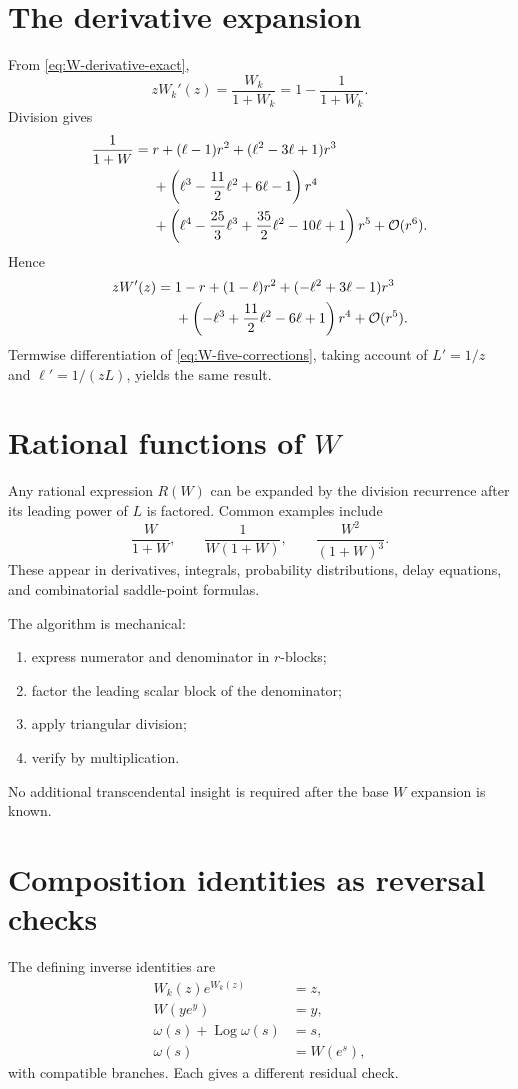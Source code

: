 \documentclass[11pt,openany]{book}
\theoremstyle{definition}
\theoremstyle{plain}
\theoremstyle{remark}
\newcommand{\bigO}{\mathcal{O}}
\DeclareMathOperator{\Log}{Log}
\begin{document}
\section{The derivative expansion}
From \cref{eq:W-derivative-exact},
\begin{equation}\label{eq:zWprime}
 zW_k'(z)=\frac{W_k}{1+W_k}=1-\frac1{1+W_k}.
\end{equation}
Division gives
\begin{align}
 \frac1{1+W}={}&r+(\ell-1)r^2+(\ell^2-3\ell+1)r^3\notag\\
 &+\left(\ell^3-\frac{11}{2}\ell^2+6\ell-1\right)r^4\notag\\
 &+\left(\ell^4-\frac{25}{3}\ell^3+\frac{35}{2}\ell^2-10\ell+1\right)r^5
 +\bigO(r^6).
\label{eq:one-over-oneplusW}
\end{align}
Hence
\begin{align}
 zW'(z)={}&1-r+(1-\ell)r^2
 +(-\ell^2+3\ell-1)r^3\notag\\
 &+\left(-\ell^3+\frac{11}{2}\ell^2-6\ell+1\right)r^4
 +\bigO(r^5).
\label{eq:Wprime-series}
\end{align}
Termwise differentiation of \cref{eq:W-five-corrections}, taking account of \(L'=1/z\) and \(\ell'=1/(zL)\), yields the same result.

\section{Rational functions of \texorpdfstring{\(W\)}{W}}
Any rational expression \(R(W)\) can be expanded by the division recurrence after its leading power of \(L\) is factored. Common examples include
\[
 \frac{W}{1+W},
 \qquad
 \frac1{W(1+W)},
 \qquad
 \frac{W^2}{(1+W)^3}.
\]
These appear in derivatives, integrals, probability distributions, delay equations, and combinatorial saddle-point formulas.

The algorithm is mechanical:
\begin{enumerate}
\item express numerator and denominator in \(r\)-blocks;
\item factor the leading scalar block of the denominator;
\item apply triangular division;
\item verify by multiplication.
\end{enumerate}
No additional transcendental insight is required after the base \(W\) expansion is known.

\section{Composition identities as reversal checks}
The defining inverse identities are
\begin{align}
 W_k(z)e^{W_k(z)}&=z,\label{eq:W-check1}\\
 W(ye^y)&=y,\label{eq:W-check2}\\
 \omega(s)+\Log\omega(s)&=s,\label{eq:W-check3}\\
 \omega(s)&=W(e^s),\label{eq:W-check4}
\end{align}
with compatible branches. Each gives a different residual check.
\end{document}

